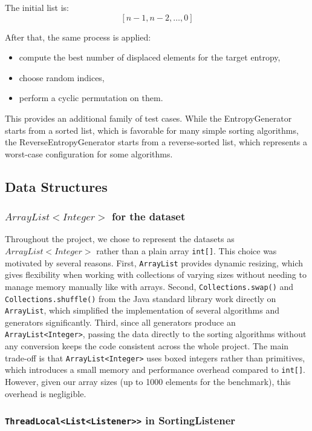 \documentclass{article}
\begin{document}
The initial list is:
\[
[n-1,n-2,\dots,0]
\]

After that, the same process is applied:
\begin{itemize}
    \item compute the best number of displaced elements for the target entropy,
    \item choose random indices,
    \item perform a cyclic permutation on them.
\end{itemize}

This provides an additional family of test cases. While the EntropyGenerator starts from a sorted list, which is favorable for many simple sorting algorithms, the ReverseEntropyGenerator starts from a reverse-sorted list, which represents a worst-case configuration for some algorithms.


\subsection{Data Structures}

\subsubsection{$ArrayList<Integer>$ for the dataset}

Throughout the project, we chose to represent the datasets as $ArrayList<Integer>$ rather than a plain array \texttt{int[]}. This choice was motivated by several reasons. First, \texttt{ArrayList} provides dynamic resizing, which gives flexibility when working with collections of varying sizes without needing to manage memory manually like with arrays. Second, \texttt{Collections.swap()} and \texttt{Collections.shuffle()} from the Java standard library work directly on \texttt{ArrayList}, which simplified the implementation of several algorithms and generators significantly. Third, since all generators produce an \texttt{ArrayList<Integer>}, passing the data directly to the sorting algorithms without any conversion keeps the code consistent across the whole project. The main trade-off is that \texttt{ArrayList<Integer>} uses boxed integers rather than primitives, which introduces a small memory and performance overhead compared to \texttt{int[]}. However, given our array sizes (up to 1000 elements for the benchmark), this overhead is negligible.

\subsubsection{\texttt{ThreadLocal<List<Listener>>} in SortingListener}
\end{document}
